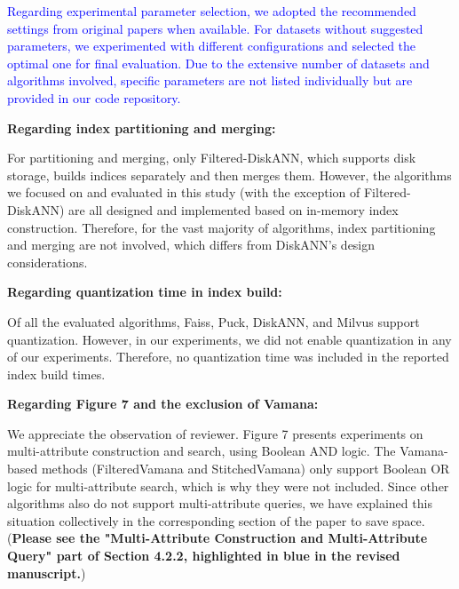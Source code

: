\documentclass[sigconf, nonacm]{acmart}
\newcounter{observation}[section]
\begin{document}
	\textcolor{blue}{
Regarding experimental parameter selection, we adopted the recommended settings from original papers when available. For datasets without suggested parameters, we experimented with different configurations and selected the optimal one for final evaluation. Due to the extensive number of datasets and algorithms involved, specific parameters are not listed individually but are provided in our code repository.}
 
\textbf{Regarding index partitioning and merging:}

For partitioning and merging, only Filtered-DiskANN, which supports disk storage, builds indices separately and then merges them. However, the algorithms we focused on and evaluated in this study (with the exception of Filtered-DiskANN) are all designed and implemented based on in-memory index construction. Therefore, for the vast majority of algorithms, index partitioning and merging are not involved, which differs from DiskANN's design considerations.

\textbf{Regarding quantization time in index build:}

Of all the evaluated algorithms, Faiss, Puck, DiskANN, and Milvus support quantization. However, in our experiments, we did not enable quantization in any of our experiments. Therefore, no quantization time was included in the reported index build times.

\textbf{Regarding Figure 7 and the exclusion of Vamana:}

We appreciate the observation of reviewer. Figure 7 presents experiments on multi-attribute construction and search, using Boolean AND logic. The Vamana-based methods (FilteredVamana and StitchedVamana) only support Boolean OR logic for multi-attribute search, which is why they were not included. Since other algorithms also do not support multi-attribute queries, we have explained this situation collectively in the corresponding section of the paper to save space. (\textbf{Please see the "Multi-Attribute Construction and Multi-Attribute Query" part of Section 4.2.2, highlighted in blue in the revised manuscript.})
\end{document}
